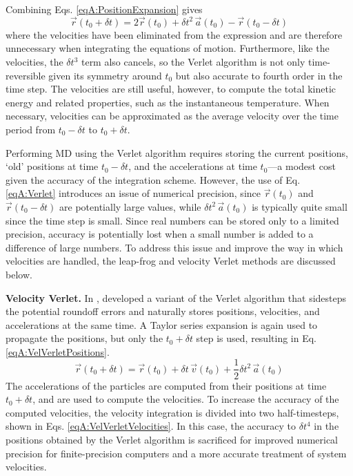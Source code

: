 Combining Eqs. \ref{eqA:PositionExpansion} gives
\begin{equation}
   \vec{r}(t_0 + \delta t) = 2 \vec{r}(t_0) + \delta t^2 \, \vec{a}(t_0) -
         \vec{r}(t_0 - \delta t)
   \label{eqA:Verlet}
\end{equation}
where the velocities have been eliminated from the expression and are therefore
unnecessary when integrating the equations of motion. Furthermore, like the
velocities, the $\delta t^3$ term also cancels, so the Verlet algorithm is not
only time-reversible given its symmetry around $t_0$ but also accurate to fourth
order in the time step. The velocities are still useful, however, to compute the
total kinetic energy and related properties, such as the instantaneous
temperature. When necessary, velocities can be approximated as the average
velocity over the time period from $t_0-\delta t$ to $t_0+\delta t$.

Performing MD using the Verlet algorithm requires storing the current positions,
`old' positions at time $t_0-\delta t$, and the accelerations at time $t_0$---a
modest cost given the accuracy of the integration scheme. However, the use of
Eq. \ref{eqA:Verlet} introduces an issue of numerical precision, since
$\vec{r}(t_0)$ and $\vec{r}(t_0 - \delta t)$ are potentially large values, while
$\delta t^2 \, \vec{a}(t_0)$ is typically quite small since the time step is
small. Since real numbers can be stored only to a limited precision, accuracy is
potentially lost when a small number is added to a difference of large numbers.
\cite{Allen_Tildesley} To address this issue and improve the way in which
velocities are handled, the leap-frog and velocity Verlet methods are discussed
below.

\textbf{Velocity Verlet.} In \citeyear{Swope_JChemPhys_1982_v76_p637},
\citeauthor{Swope_JChemPhys_1982_v76_p637} developed a variant of the Verlet
algorithm that sidesteps the potential roundoff errors and naturally stores
positions, velocities, and accelerations at the same time. A Taylor series
expansion is again used to propagate the positions, but only the $t_0+\delta t$
step is used, resulting in Eq. \ref{eqA:VelVerletPositions}.
\begin{equation}
   \vec{r}(t_0 + \delta t) = \vec{r}(t_0) + \delta t \, \vec{v}(t_0) + \frac 1 2
         \delta t^2 \, \vec{a}(t_0)
   \label{eqA:VelVerletPositions}
\end{equation}
The accelerations of the particles are computed from their positions at time
$t_0 + \delta t$, and are used to compute the velocities. To increase the
accuracy of the computed velocities, the velocity integration is divided into
two half-timesteps, shown in Eqs. \ref{eqA:VelVerletVelocities}. In this case,
the accuracy to $\delta t^4$ in the positions obtained by the Verlet algorithm
is sacrificed for improved numerical precision for finite-precision computers
and a more accurate treatment of system velocities.

